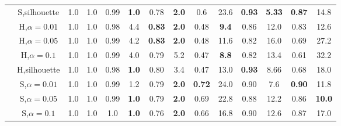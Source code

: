 \begin{table*}
\begin{center}
{\begin{tabular}[th]{cccccccccccccc}
                                                                                    & S,silhouette      & 1.0  & 1.0        & 0.99 & \textbf{1.0}        & 0.78 & \textbf{2.0}          & 0.6 & 23.6                 & \textbf{0.93} & \textbf{5.33}       & \textbf{0.87} & 14.8 \\
                                                                       
                                                                                    & H,$\alpha=0.01$   & 1.0  & 1.0        & 0.98 & 4.4                 & \textbf{0.83} & \textbf{2.0} & 0.48 & \textbf{9.4}        & 0.86 & 12.0       & 0.83 & 12.6  \\
               
                                                                                    & H,$\alpha=0.05$   & 1.0  & 1.0        & 0.99 & 4.2                 & \textbf{0.83} & \textbf{2.0} & 0.48 & 11.6                & 0.82 & 16.0       & 0.69 & 27.2 \\
               
                                                                                    & H,$\alpha=0.1$    & 1.0  & 1.0        & 0.99 & 4.0                 & 0.79 & 5.2                   & 0.47 & \textbf{8.8}        & 0.82 & 13.4       & 0.61 & 32.2 \\
                
                                                                                    & H,silhouette      & 1.0  & 1.0        & 0.98 & \textbf{1.0}        & 0.80 & 3.4                   & 0.47 & 13.0                & \textbf{0.93} & 8.66       & 0.68 & 18.0 \\
                \midrule
   \parbox[t]{2mm}{} & S,$\alpha=0.01$   & 1.0  & 1.0        & 0.99 & 1.2                 & 0.79 & \textbf{2.0}          & \textbf{0.72} & 24.0       & 0.90 & 7.6        & \textbf{0.90} & 11.8 \\
                
                                                                                    & S,$\alpha=0.05$   & 1.0  & 1.0        & 0.99 & \textbf{1.0}        & 0.79 & \textbf{2.0}          & 0.69 & 22.8                & 0.88 & 12.2       & 0.86 & \textbf{10.0} \\
                
                                                                                    & S,$\alpha=0.1$    & 1.0  & 1.0        & 1.0 & \textbf{1.0}         & 0.76 & \textbf{2.0}          & 0.66 & 16.8                & 0.90 & 12.6       & 0.87 & 17.0 \\
                

\end{tabular}}
\end{center}
\end{table*}
